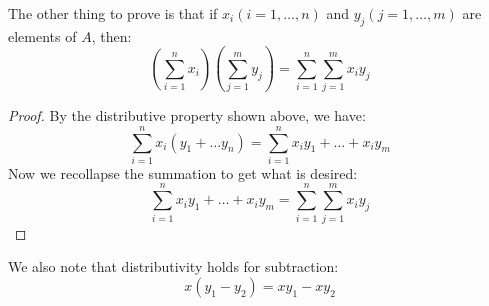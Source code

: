\documentclass{report}
\begin{document}
The other thing to prove is that if $x_{i} (i = 1, \ldots, n)$ and $y_{j}(j = 1, \ldots, m)$ are elements of $A$, then:
    \begin{equation*}
        \left(\sum_{i = 1}^{n} x_{i}\right)\left(\sum_{j = 1}^{m} y_{j}\right) = \sum_{i = 1}^{n} \sum_{j = 1}^{m} x_{i}y_{j}
    \end{equation*}
    \begin{proof}
        By the distributive property shown above, we have:
            \begin{equation*}
                \sum_{i = 1}^{n} x_{i}(y_{1} + \ldots y_{n}) = \sum_{i = 1}^{n} x_{i}y_{1} + \ldots + x_{i}y_{m}
            \end{equation*}
        Now we recollapse the summation to get what is desired:
           \begin{equation*}
                \sum_{i = 1}^{n} x_{i}y_{1} + \ldots + x_{i}y_{m} = \sum_{i = 1}^{n} \sum_{j = 1}^{m}  x_{i}y_{j}
            \end{equation*}
    \end{proof}

We also note that distributivity holds for subtraction:
    \begin{equation*}
        x(y_{1} - y_{2}) = xy_{1} - xy_{2}
    \end{equation*}
\end{document}
